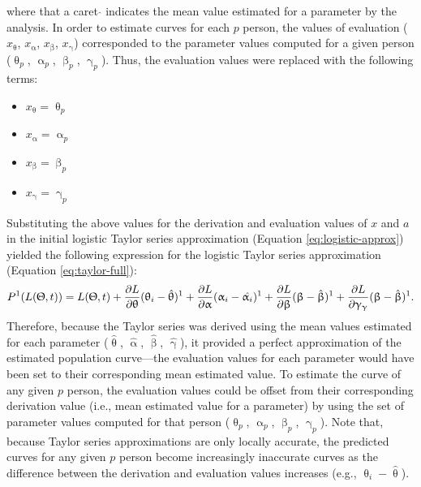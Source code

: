 \documentclass[
12pt, %
twoside,
english]{guelphthesis}
\theoremstyle{definition}
\theoremstyle{definition}
\theoremstyle{definition}
\theoremstyle{definition}
\theoremstyle{remark}
\begin{document}
\noindent where that a caret \(\hat{}\) indicates the mean value estimated for a parameter by the analysis. In order to estimate curves for each \(p\) person, the values of
evaluation (\(x_{\uptheta}\), \(x_{\upalpha}\), \(x_{\upbeta}\),
\(x_{\upgamma}\)) corresponded to the parameter values computed for a
given person (\(\uptheta_p\), \(\upalpha_p\), \(\upbeta_p\), \(\upgamma_p\)). Thus, the evaluation values were replaced with the following terms:
\begin{itemize}
\tightlist
\item
  \(x_{\uptheta} = \uptheta_p\)
\item
  \(x_{\upalpha} = \upalpha_p\)
\item
  \(x_{\upbeta} = \upbeta_p\)
\item
  \(x_{\upgamma} = \upgamma_p\)
\end{itemize}
\noindent Substituting the above values for the derivation and evaluation values of \(x\) and \(a\) in the initial logistic Taylor series approximation (Equation \ref{eq:logistic-approx}) yielded the following expression for the logistic Taylor series approximation (Equation \ref{eq:taylor-full}):
\begin{align}
 P^1(L(\Uptheta, t)) = L(\Uptheta, t) + \frac{\partial L}{\partial \uptheta}(\uptheta_i-\hat{\uptheta})^1 + \frac{\partial L}{\partial \upalpha}(\upalpha_i-\hat{\upalpha_i})^1 + \frac{\partial L}{\partial \upbeta}(\upbeta-\hat{\upbeta})^1 + \frac{\partial L}{\partial \upgamma_{\upgamma}}(\upbeta-\hat{\upbeta})^1.
\label{eq:taylor-full}
\end{align}
\noindent Therefore, because the Taylor series was derived using the mean values estimated for each parameter (\(\hat{\uptheta}\), \(\hat{\upalpha}\), \(\hat{\upbeta}\),
\(\hat{\upgamma}\)), it provided a perfect approximation of the estimated
population curve---the evaluation values for each parameter would have
been set to their corresponding mean estimated value. To estimate the curve of any given \(p\) person, the evaluation values could be offset from their corresponding derivation value (i.e., mean estimated value for a parameter) by using the set of parameter values computed for that person (\(\uptheta_p\), \(\upalpha_p\), \(\upbeta_p\), \(\upgamma_p\)). Note that, because Taylor series approximations are only locally accurate, the predicted curves for any given \(p\) person become increasingly inaccurate curves as the difference between the derivation and evaluation values increases (e.g., \(\uptheta_i-\hat{\uptheta}\)).
\end{document}
